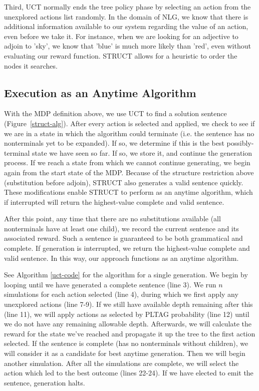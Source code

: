 Third, UCT normally ends the tree policy phase by selecting an action
from the unexplored actions list randomly.  In the domain of NLG,
we know that there is additional information available to our system
regarding the value of an action, even before we take it. For instance,
when we are looking for an adjective to adjoin to 'sky', we know that 'blue' is
much more likely than 'red', even without evaluating our reward function.
STRUCT allows for a heuristic to order the nodes
it searches.

\subsection{Execution as an Anytime Algorithm}
 With the MDP definition above, we use UCT to find a solution sentence
 (Figure~\ref{struct-alg}). After every action is
 selected and applied, we check to see if we are in a state in which
 the algorithm could terminate (i.e. the sentence has no nonterminals
 yet to be expanded).  If so, we determine if this is the best
 possibly-terminal state we have seen so far.  If so, we store it, and
 continue the generation process. If we reach a state from which we
 cannot continue generating, we begin again from the start state of
 the MDP. Because of the structure restriction above (substitution
 before adjoin), STRUCT also generates a valid sentence quickly. These
 modifications enable STRUCT to perform as an anytime algorithm, which
 if interrupted will return the highest-value complete and valid
 sentence.

After this point, any time that there are no substitutions
available (all nonterminals have at least one child), we record the
current sentence and its associated reward.  Such a sentence is
guaranteed to be both grammatical and complete.  If generation is
interrupted, we return the highest-value complete and valid sentence.
In this way, our approach functions as an anytime algorithm.

See Algorithm \ref{uct-code} for the algorithm for a single generation.
We begin by looping until we have generated a complete sentence
(line 3).  We run $n$ simulations for each action selected (line 4),
during which we first apply any unexplored actions (line 7-9).  If
we still have available depth remaining after this (line 11), we will
apply actions as selected by PLTAG probability (line 12) until we
do not have any remaining allowable depth.  Afterwards, we will
calculate the reward for the state we've reached and propagate it
up the tree to the first action selected.  If the sentence is complete
(has no nonterminals without children), we will consider it as a candidate
for best anytime generation.  Then we will begin another
simulation.  After all the simulations are complete, we will select
the action which led to the best outcome (lines 22-24).  If we have
elected to emit the sentence, generation halts.

